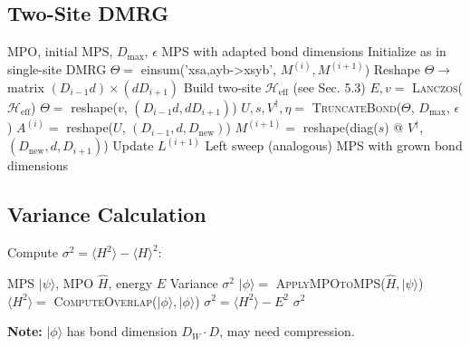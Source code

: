 \documentclass[aps,prb,onecolumn,scriptaddress]{revtex4-2}
\newcommand{\eps}{\epsilon}
\begin{document}
	\subsection{Two-Site DMRG}
	
	\begin{algorithm}[H]
		\caption{TwoSiteDMRG (First 3-5 sweeps)}
		\begin{algorithmic}[1]
			\Require MPO, initial MPS, $D_{\max}$, $\eps$
			\Ensure MPS with adapted bond dimensions
			\State Initialize as in single-site DMRG
			\State {}
			\State $\Theta = $ einsum('xsa,ayb->xsyb', $M^{(i)}, M^{(i+1)}$)
			\State Reshape $\Theta \to$ matrix $(D_{i-1}d) \times (dD_{i+1})$
			\State Build two-site $\mathcal{H}_{\text{eff}}$ (see Sec. 5.3)
			\State $E, v = $ \textsc{Lanczos}($\mathcal{H}_{\text{eff}}$)
			\State $\Theta = $ reshape($v$, $(D_{i-1}d, dD_{i+1})$)
			\State $U, s, V^\dagger, \eta = $ \textsc{TruncateBond}($\Theta$, $D_{\max}$, $\eps$)
			\State $A^{(i)} = $ reshape($U$, $(D_{i-1}, d, D_{\text{new}})$)
			\State $M^{(i+1)} = $ reshape(diag($s$) @ $V^\dagger$, $(D_{\text{new}}, d, D_{i+1})$)
			\State Update $L^{(i+1)}$
			\EndFor
			\State Left sweep (analogous)
			\EndFor
			\State \Return MPS with grown bond dimensions
		\end{algorithmic}
	\end{algorithm}
	
	\subsection{Variance Calculation}
	
	Compute $\sigma^2 = \langle H^2 \rangle - \langle H \rangle^2$:
	
	\begin{algorithm}[H]
		\caption{ComputeVariance}
		\begin{algorithmic}[1]
			\Require MPS $|\psi\rangle$, MPO $\hat{H}$, energy $E$
			\Ensure Variance $\sigma^2$
			\State $|\phi\rangle = $ \textsc{ApplyMPOtoMPS}($\hat{H}, |\psi\rangle$)
			\State $\langle H^2 \rangle = $ \textsc{ComputeOverlap}($|\phi\rangle, |\phi\rangle$)
			\State $\sigma^2 = \langle H^2 \rangle - E^2$
			\State \Return $\sigma^2$
		\end{algorithmic}
	\end{algorithm}
	
	\textbf{Note:} $|\phi\rangle$ has bond dimension $D_W \cdot D$, may need compression.
	
\end{document}
